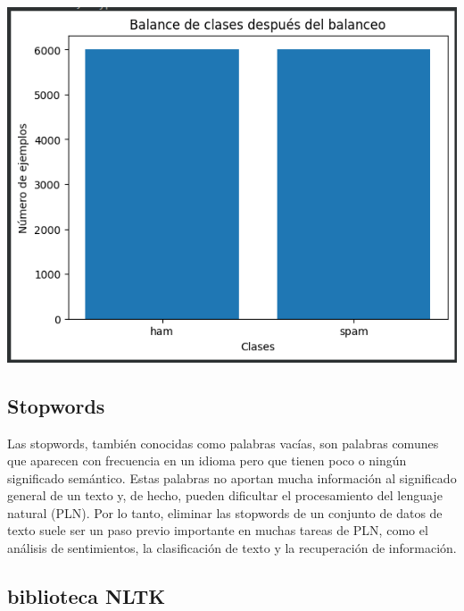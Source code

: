 \begin{center}
    \includegraphics[scale = .5]{IMA/underbalance.png}
\end{center}


\subsection{Stopwords}


Las stopwords, también conocidas como palabras vacías, son palabras comunes que aparecen 
con frecuencia en un idioma pero que tienen poco o ningún significado semántico. Estas 
palabras no aportan mucha información al significado general de un texto y, de hecho, pueden 
dificultar el procesamiento del lenguaje natural (PLN). Por lo tanto, eliminar las stopwords 
de un conjunto de datos de texto suele ser un paso previo importante en muchas tareas de PLN, 
como el análisis de sentimientos, la clasificación de texto y la recuperación de información.\\ 

\subsection*{biblioteca NLTK}

